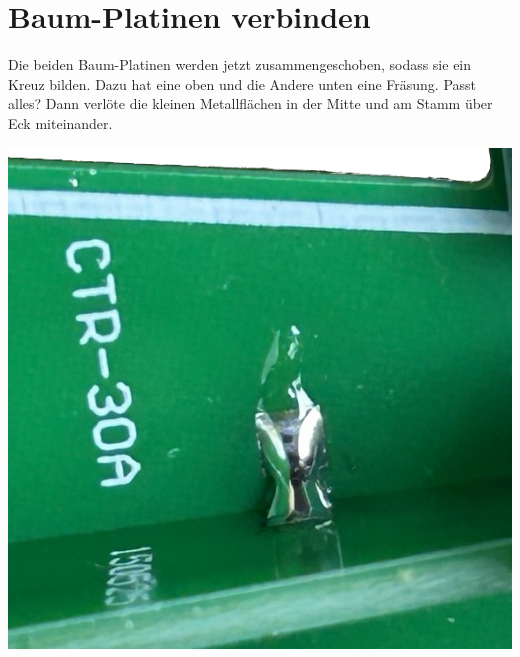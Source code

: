 \documentclass[10pt]{article}
\begin{document}
	\section{Baum-Platinen verbinden}
	\begin{minipage}{0.9\textwidth}
		Die beiden Baum-Platinen werden jetzt zusammengeschoben, sodass sie ein Kreuz bilden. Dazu hat eine oben und die Andere unten eine Fräsung. Passt alles? Dann verlöte die kleinen Metallflächen in der Mitte und am Stamm über Eck miteinander.
	\end{minipage}
	\begin{minipage}{0.1\textwidth}\raggedright
		\includegraphics[width=\linewidth]{x-solder.png}
	\end{minipage}	
	
\end{document}
